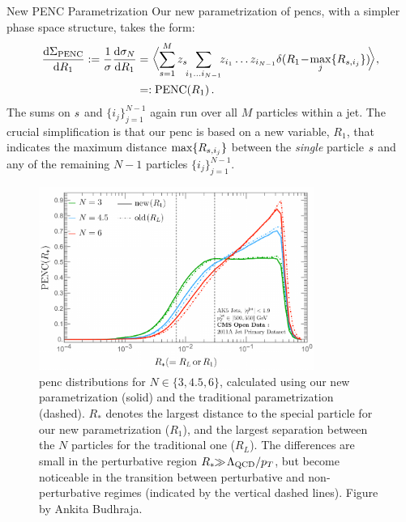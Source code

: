 \begin{definitionbox}{New PENC Parametrization}{}
    Our new parametrization of \glspl{penc}, with a simpler phase space structure, takes the form:
    \begin{align}
        \label{eq:new_def}
        \frac{\dd \Sigma_\text{PENC}}{\dd R_1}
        :=
        \frac{1}{\sigma}\frac{\dd \sigma_N}{\dd R_1}
        &=
        \biggl\langle
            \sum_{\izero=1}^M  z_{\izero} \!\!
            \sum_{i_1 \dots i_{N-1}}
           \!\! z_{i_1} \dots z_{i_{N-1}}
            \delta (
                R_1
                \!-\!
                \max_j\{R_{\izero,i_j}\}
            ) \!
        \biggr\rangle ,
        \notag \\
        &=: \text{PENC}(R_1) \,
        .
    \end{align}
    The sums on \(s\) and \(\{i_j\}_{j=1}^{N-1}\) again run over all $M$ particles within a jet.
    The crucial simplification is that our \gls{penc} is based on a new variable, \(R_1\), that indicates the maximum distance \(\max\{R_{s, i_j}\}\) between the \textit{single} particle \(s\) and any of the remaining $N-1$ particles \(\{i_j\}_{j=1}^{N-1}\).
\end{definitionbox}


\begin{figure}
    \centering
    \includegraphics[width=0.8\textwidth]{figures/eec-angles/ENC.pdf}
    \caption[%
        Comparisons of the new and traditional parameterizations of projected ENCs.
        Figure by Ankita Budhraja.
    ]{
        \gls{penc} distributions for $N \in \{3, 4.5, 6\}$, calculated using our new parametrization (solid) and the traditional parametrization (dashed).
        $R_{*}$ denotes the largest distance to the special particle for our new parametrization ($R_1$), and the largest separation between the $N$ particles for the traditional one ($R_L$).
        The differences are small in the perturbative region $R_{*} \!\! \gg  \! \Lambda_{\rm QCD} /p_T$, but become noticeable in the transition between perturbative and non-perturbative regimes (indicated by the vertical dashed lines).
        Figure by Ankita Budhraja.
    }
	\label{fig:ENC}%
\end{figure}

